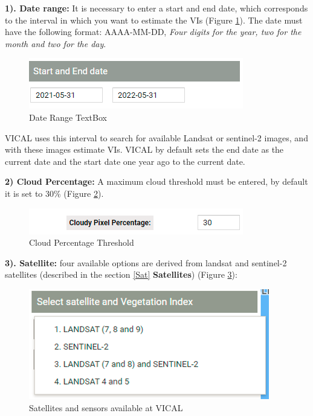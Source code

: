 \documentclass[
]{book}
\begin{document}
\textbf{1). Date range: } It is necessary to enter a start and end date, which corresponds to the interval in which you want to estimate the VIs (Figure \ref{fig:figG1}). The date must have the following format: AAAA-MM-DD, \emph{Four digits for the year, two for the month and two for the day}.

\begin{figure}

{\centering \includegraphics{./images/Figure1} 

}

\caption{Date Range TextBox}\label{fig:figG1}
\end{figure}

VICAL uses this interval to search for available Landsat or sentinel-2 images, and with these images estimate VIs. VICAL by default sets the end date as the current date and the start date one year ago to the current date.

\textbf{2) Cloud Percentage: } A maximum cloud threshold must be entered, by default it is set to 30\% (Figure \ref{fig:figG2}).

\begin{figure}

{\centering \includegraphics{./images/Figure2} 

}

\caption{Cloud Percentage Threshold}\label{fig:figG2}
\end{figure}

\textbf{3). Satellite: } four available options are derived from landsat and sentinel-2 satellites (described in the section \ref{Sat} \textbf{Satellites}) (Figure \ref{fig:figG3}):

\begin{figure}

{\centering \includegraphics{./images/Figure3} 

}

\caption{Satellites and sensors available at VICAL}\label{fig:figG3}
\end{figure}
\end{document}
